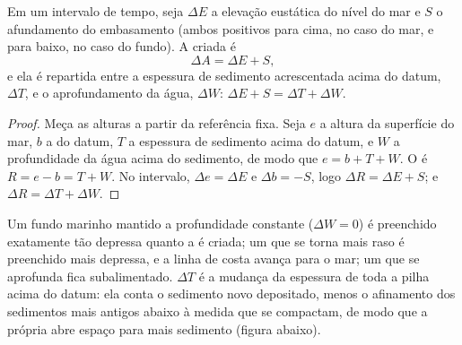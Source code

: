 \begin{proposition}\label{prop:b1:diagenesis-basins:budget}
Em um intervalo de tempo, seja $\Delta E$ a elevação eustática do nível do mar e $S$ o
afundamento do embasamento (ambos positivos para cima, no caso do mar, e para baixo, no caso
do fundo). A  criada é
\[
  \Delta A = \Delta E + S ,
\]
e ela é repartida entre a espessura de sedimento acrescentada acima do datum,
$\Delta T$, e o aprofundamento da água, $\Delta W$:
$\Delta E + S = \Delta T + \Delta W$.
\end{proposition}

\begin{proof}
Meça as alturas a partir da referência fixa. Seja $e$ a altura da superfície do mar, $b$ a
do datum, $T$ a espessura de sedimento acima do datum, e $W$ a profundidade da água acima
do sedimento, de modo que $e = b + T + W$. O  é $R = e - b = T + W$. No
intervalo, $\Delta e =
\Delta E$ e $\Delta b = -S$, logo $\Delta R = \Delta E + S$; e $\Delta R =
\Delta T + \Delta W$.
\end{proof}

Um fundo marinho mantido a profundidade constante ($\Delta W = 0$) é preenchido exatamente
tão depressa quanto a  é criada; um que se torna mais raso é preenchido mais
depressa, e a linha de costa avança para o mar; um que se aprofunda fica subalimentado. $\Delta T$
é a mudança da espessura de toda a pilha acima do datum: ela conta o sedimento novo
depositado, menos o afinamento dos sedimentos mais antigos abaixo à medida que se compactam,
de modo que a própria  abre espaço para mais sedimento (figura abaixo).

